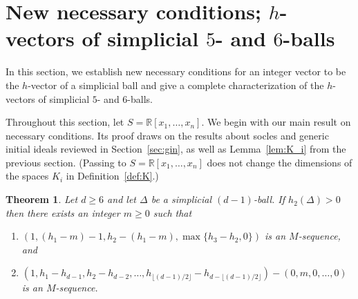\documentclass[11pt]{article}
\newtheorem{theorem}{Theorem}[section]
\theoremstyle{definition}
\numberwithin{equation}{theorem}
\newcommand{\kk}{{\mathbb R}}
\begin{document}
\section{New necessary conditions; $h$-vectors of simplicial $5$- and $6$-balls}\label{sec:main}

In this section, we establish new necessary conditions for an integer vector to be the $h$-vector of a simplicial ball and give a complete characterization of the $h$-vectors of simplicial $5$- and $6$-balls.

Throughout this section, let $S=\kk[x_1,\dots,x_n]$.
We begin with our main result on necessary conditions. Its proof draws on the results about socles and generic initial ideals reviewed in Section~\ref{sec:gin}, as well as Lemma~\ref{lem:K_i} from the previous section. (Passing to $S=\kk[x_1,\dots,x_n]$ does not change the dimensions of the spaces $K_i$ in Definition~\ref{def:K}.)

\begin{theorem}\label{thm:main}
Let $d \geq 6$ and let $\Delta$ be a simplicial $(d-1)$-ball. If $h_2(\Delta)>0$ then there exists an integer $m \geq 0$ such that
\begin{enumerate}
\item $(1, (h_1-m)-1, h_2-(h_1-m), \max\{h_3-h_2, 0\})$ is an $M$-sequence, and
\item $(1, h_1-h_{d-1}, h_2-h_{d-2}, \ldots, h_{\lfloor (d-1)/2 \rfloor}-h_{d-\lfloor (d-1)/2 \rfloor})-(0,m,0,\dots,0)$ is an $M$-sequence.
\end{enumerate}
\end{theorem}
\end{document}
